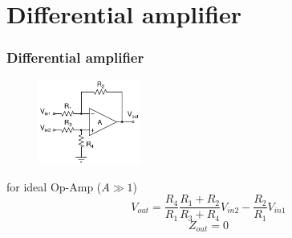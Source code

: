 \documentclass[beamer]{standalone}
\begin{document}
\section{Differential amplifier}
\begin{frame}
\frametitle{Differential amplifier}
\begin{figure}
	\includegraphics[width=0.30\textwidth]{./schematics/differential_ampl.pdf}
\end{figure}

\begin{block}{for ideal Op-Amp ($A \gg 1$)}
\begin{equation*}
	V_{out}= 
	 \frac{R_4}{R_1} \frac{R_1+R_2}{R_3+R_4} V_{in2}- \frac{R_2}{R_1}V_{in1}
\end{equation*}
\begin{equation*}
	 Z_{out}=0
\end{equation*}
\end{block}
\end{frame}
\end{document}
